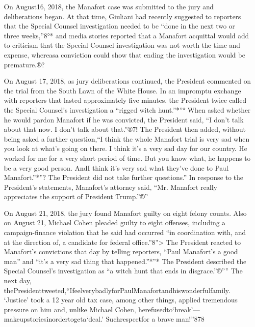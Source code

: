 On August16, 2018, the Manafort case was submitted to the jury and deliberations began. At that time, Giuliani had recently suggested to reporters that the Special Counsel investigation needed to be “done in the next two or three weeks,”8°* and media stories reported that a Manafort acquittal would add to criticism that the Special Counsel investigation was not worth the time and expense, whereasa conviction could show that ending the investigation would be premature.®?

On August 17, 2018, as jury deliberations continued, the President commented on the trial from the South Lawn of the White House. In an impromptu exchange with reporters that lasted approximately five minutes, the President twice called the Special Counsel's investigation a “rigged witch hunt.”*”° When asked whether he would pardon Manafort if he was convicted, the President said, “I don't talk about that now. I don't talk about that.”®7! The President then added, without being asked a further question,“I think the whole Manafort trial is very sad when you look at what's going on there. I think it's a very sad day for our country. He worked for me for a very short period of time. But you know what, he happens to be a very good person. AndI think it's very sad what they've done to Paul Manafort.”*”? The President did not take further questions.” In response to the President's statements, Manafort's attorney said, “Mr. Manafort really appreciates the support of President Trump.”®”

On August 21, 2018, the jury found Manafort guilty on eight felony counts. Also on August 21, Michael Cohen pleaded guilty to eight offenses, including a campaign-finance violation that he said had occurred “in coordination with, and at the direction of, a candidate for federal office.”8”> The President reacted to Manafort's convictions that day by telling reporters, “Paul Manafort's a good man” and “it's a very sad thing that happened.”*”* The President described the Special Counsel's investigation as “a witch hunt that ends in disgrace.”®”” The next day, thePresidenttweeted,“IfeelverybadlyforPaulManafortandhiswonderfulfamily. ‘Justice' took a 12 year old tax case, among other things, applied tremendous pressure on him and, unlike Michael Cohen, herefusedto‘break'—makeupstoriesinordertogeta‘deal.' Suchrespectfor a brave man!”878

